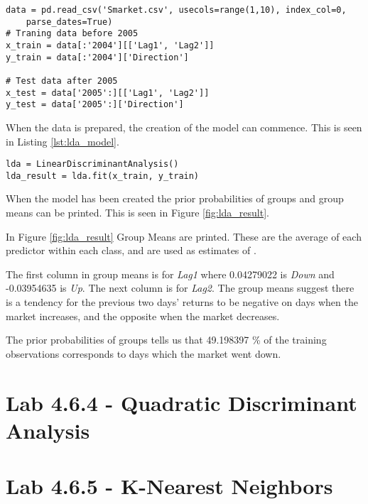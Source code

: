 \begin{lstlisting}[caption={Preparation of data for LDA fitting}, label=lst:lda_data, mathescape=true]
data = pd.read_csv('Smarket.csv', usecols=range(1,10), index_col=0, 
	parse_dates=True)
# Traning data before 2005
x_train = data[:'2004'][['Lag1', 'Lag2']]
y_train = data[:'2004']['Direction']

# Test data after 2005
x_test = data['2005':][['Lag1', 'Lag2']]
y_test = data['2005':]['Direction']
\end{lstlisting}

When the data is prepared, the creation of the model can commence. This is seen in Listing \ref{lst:lda_model}.

\begin{lstlisting}[caption={Creation of LDA model}, label=lst:lda_model, mathescape=true]
lda = LinearDiscriminantAnalysis()
lda_result = lda.fit(x_train, y_train)
\end{lstlisting}

When the model has been created the prior probabilities of groups and group means can be printed. This is seen in Figure \ref{fig:lda_result}. 

In Figure \ref{fig:lda_result} Group Means are printed. These are the average
of each predictor within each class, and are used as estimates of .


The first column in group means is for \emph{Lag1} where 0.04279022 is \emph{Down} and -0.03954635 is \emph{Up}. The next column is for \emph{Lag2}. The group means suggest there is a tendency for the previous two days' returns to be negative on days when the market increases, and the opposite when the market decreases. 


The prior probabilities of groups tells us that 49.198397 \% of the training observations corresponds to days which the market went down. 

\section{Lab 4.6.4 - Quadratic Discriminant Analysis}
\section{Lab 4.6.5 - K-Nearest Neighbors}

